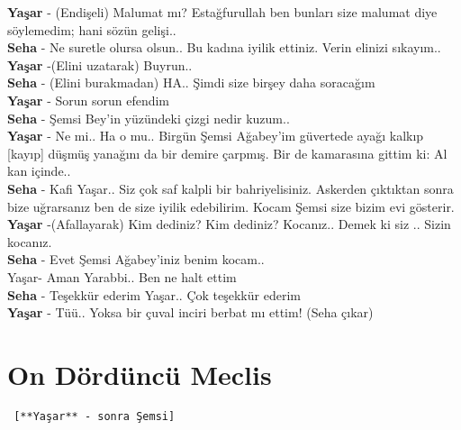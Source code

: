 \documentclass[]{book}
\begin{document}
\textbf{Yaşar} - (Endişeli) Malumat mı? Estağfurullah ben bunları size malumat diye söylemedim; hani sözün gelişi..\\
\textbf{Seha} - Ne suretle olursa olsun.. Bu kadına iyilik ettiniz. Verin elinizi sıkayım..\\
\textbf{Yaşar} -(Elini uzatarak) Buyrun..\\
\textbf{Seha} - (Elini burakmadan) HA.. Şimdi size birşey daha soracağım\\
\textbf{Yaşar} - Sorun sorun efendim\\
\textbf{Seha} - Şemsi Bey'in yüzündeki çizgi nedir kuzum..\\
\textbf{Yaşar} - Ne mi.. Ha o mu.. Birgün Şemsi Ağabey'im güvertede ayağı kalkıp {[}kayıp{]} düşmüş yanağını da bir demire çarpmış. Bir de kamarasına gittim ki: Al kan içinde..\\
\textbf{Seha} - Kafi Yaşar.. Siz çok saf kalpli bir bahriyelisiniz. Askerden çıktıktan sonra bize uğrarsanız ben de size iyilik edebilirim. Kocam Şemsi size bizim evi gösterir.\\
\textbf{Yaşar} -(Afallayarak) Kim dediniz? Kim dediniz? Kocanız.. Demek ki siz .. Sizin kocanız.\\
\textbf{Seha} - Evet Şemsi Ağabey'iniz benim kocam..\\
Yaşar- Aman Yarabbi.. Ben ne halt ettim\\
\textbf{Seha} - Teşekkür ederim Yaşar.. Çok teşekkür ederim\\
\textbf{Yaşar} - Tüü.. Yoksa bir çuval inciri berbat mı ettim! (Seha çıkar)\\

\hypertarget{on-dorduncu-meclis-2}{%
\section{On Dördüncü Meclis}\label{on-dorduncu-meclis-2}}

\begin{verbatim}
 [**Yaşar** - sonra Şemsi]
\end{verbatim}
\end{document}
